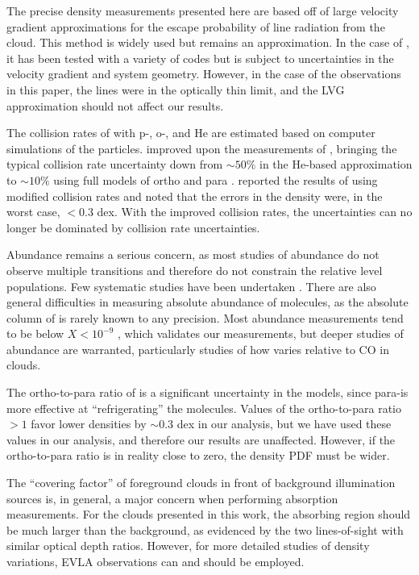 The precise density measurements presented here are based off of large velocity
gradient approximations \citep{Sobolev1957a} for the escape probability of line
radiation from the cloud.  This method is widely used but remains an
approximation.  In the case of \formaldehyde, it has been tested with a variety
of codes \cite{van-der-Tak2007a,Henkel1983a} but is subject to uncertainties in
the velocity gradient and system geometry.  However, in the case of the
observations in this paper, the lines were in the optically thin limit, and the
LVG approximation should not affect our results.

The collision rates of \formaldehyde with p-\hh, o-\hh, and He are estimated
based on computer simulations of the particles.  \citet{Troscompt2009a}
improved upon the measurements of \citet{Green1991a}, bringing the typical
collision rate uncertainty down from $\sim50\%$ in the He-based approximation
to $\sim10\%$ using full models of ortho and para \hh.  \citet{Zeiger2010a}
reported the results of using modified collision rates and noted that the
errors in the \hh density were, in the worst case, $<0.3$ dex.  With the
improved \citet{Troscompt2009a} collision rates, the uncertainties can no
longer be dominated by collision rate uncertainties.

Abundance remains a serious concern, as most studies of \formaldehyde abundance
do not observe multiple transitions and therefore do not constrain the relative
level populations.  Few systematic studies have been undertaken
\citep[e.g.]{Liszt2006a}.  There are also general difficulties in measuring absolute
abundance of molecules, as the absolute column of \hh is rarely known to any
precision.  Most abundance measurements tend to be below $X<10^{-9}$
\citep{Pauls1996a,Dickens1999a,Turner1989a,Turner1993a}, which validates our
measurements, but deeper studies of abundance are warranted, particularly
studies of how \formaldehyde varies relative to CO in clouds.

The ortho-to-para ratio of \hh is a significant uncertainty in the models,
since para-\hh is more effective at ``refrigerating'' the \formaldehyde
molecules.  Values of the ortho-to-para ratio $>1$ favor lower densities by
$\sim0.3$ dex in our analysis, but we have used these values in our analysis,
and therefore our results are unaffected.  However, if the ortho-to-para ratio
is in reality close to zero, the density PDF must be wider.

The ``covering factor'' of foreground clouds in front of background
illumination sources is, in general, a major concern when performing absorption
measurements.  For the clouds presented in this work, the absorbing region
should be much larger than the background, as evidenced by the two
lines-of-sight with similar optical depth ratios.  However, for more detailed
studies of density variations, EVLA observations can and should be employed.

